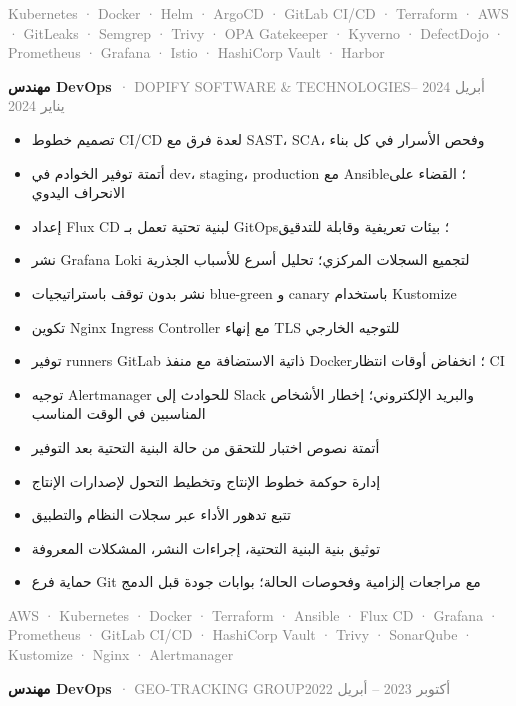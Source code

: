 \documentclass[10pt,a4paper]{article}
\newcommand{\cventry}[3]{\textbf{#1}\ \textcolor{graytext}{· #2}\hfill\textcolor{graytext}{\small #3}\par}
\newcommand{\tagline}[1]{\textcolor{graytext}{\small #1}\par}
\begin{document}
\tagline{Kubernetes · Docker · Helm · ArgoCD · GitLab CI/CD · Terraform · AWS · GitLeaks · Semgrep · Trivy · OPA Gatekeeper · Kyverno · DefectDojo · Prometheus · Grafana · Istio · HashiCorp Vault · Harbor}
\vspace{1pt}
\vspace{3pt}
\cventry{مهندس DevOps}{DOPIFY SOFTWARE \& TECHNOLOGIES}{أبريل 2024 – يناير 2024}
\begin{itemize}
  \item تصميم خطوط CI/CD لعدة فرق مع SAST، SCA، وفحص الأسرار في كل بناء
  \item أتمتة توفير الخوادم في dev، staging، production مع Ansible؛ القضاء على الانحراف اليدوي
  \item إعداد Flux CD لبنية تحتية تعمل بـ GitOps؛ بيئات تعريفية وقابلة للتدقيق
  \item نشر Grafana Loki لتجميع السجلات المركزي؛ تحليل أسرع للأسباب الجذرية
  \item نشر بدون توقف باستراتيجيات blue-green و canary باستخدام Kustomize
  \item تكوين Nginx Ingress Controller مع إنهاء TLS للتوجيه الخارجي
  \item توفير runners GitLab ذاتية الاستضافة مع منفذ Docker؛ انخفاض أوقات انتظار CI
  \item توجيه Alertmanager للحوادث إلى Slack والبريد الإلكتروني؛ إخطار الأشخاص المناسبين في الوقت المناسب
  \item أتمتة نصوص اختبار للتحقق من حالة البنية التحتية بعد التوفير
  \item إدارة حوكمة خطوط الإنتاج وتخطيط التحول لإصدارات الإنتاج
  \item تتبع تدهور الأداء عبر سجلات النظام والتطبيق
  \item توثيق بنية البنية التحتية، إجراءات النشر، المشكلات المعروفة
  \item حماية فرع Git مع مراجعات إلزامية وفحوصات الحالة؛ بوابات جودة قبل الدمج
\end{itemize}
\tagline{AWS · Kubernetes · Docker · Terraform · Ansible · Flux CD · Grafana · Prometheus · GitLab CI/CD · HashiCorp Vault · Trivy · SonarQube · Kustomize · Nginx · Alertmanager}
\vspace{1pt}
\vspace{3pt}
\cventry{مهندس DevOps}{GEO-TRACKING GROUP}{أكتوبر 2023 – أبريل 2022}
\end{document}
